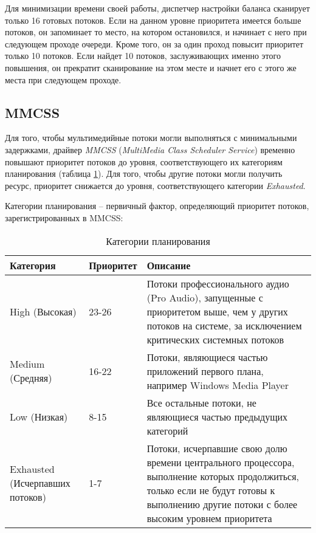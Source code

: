 Для минимизации времени своей работы, диспетчер настройки баланса сканирует только 16 готовых потоков. Если на данном уровне приоритета имеется больше потоков, он запоминает то место, на котором остановился, и начинает с него при следующем проходе очереди. Кроме того, он за один проход повысит приоритет только 10 потоков. Если найдет 10 потоков, заслуживающих именно этого повышения, он прекратит сканирование на этом месте и начнет его с этого же места при следующем проходе.

\subsection*{MMCSS}
Для того, чтобы мультимедийные потоки могли выполняться с минимальными задержками, драйвер \textit{MMCSS} (\textit{MultiMedia Class Scheduler Service}) временно повышают приоритет потоков до уровня, соответствующего их категориям планирования (таблица \ref{tab:category}). Для того, чтобы другие потоки могли получить ресурс, приоритет снижается до уровня, соответствующего категории \textit{Exhausted}.

Категории планирования -- первичный фактор, определяющий приоритет потоков, зарегистрированных в MMCSS:
\begin{table}[!h]
	\caption{Категории планирования}
	\begin{center}
		\begin{tabular}{|p{40mm}|p{30mm}|p{80mm}|}
			\hline
			\textbf{Категория} & \textbf{Приоритет} & \textbf{Описание} \\
			\hline
			High (Высокая) & 23-26 & Потоки профессионального аудио (Pro
			Audio), запущенные с приоритетом выше, чем у других потоков на системе, за
			исключением критических системных потоков \\
			\hline
			Medium (Средняя) & 16-22 & Потоки, являющиеся частью приложений
			первого плана, например Windows Media Player \\
			\hline
			Low (Низкая) & 8-15 & Все остальные потоки, не являющиеся частью
			предыдущих категорий \\
			\hline
			Exhausted (Исчерпавших потоков) & 1-7 & Потоки, исчерпавшие свою
			долю времени центрального процессора, выполнение которых продолжиться, только
			если не будут готовы к выполнению другие потоки с более высоким уровнем
			приоритета \\
			\hline
		\end{tabular}
	\end{center}
	\label{tab:category}
\end{table}

